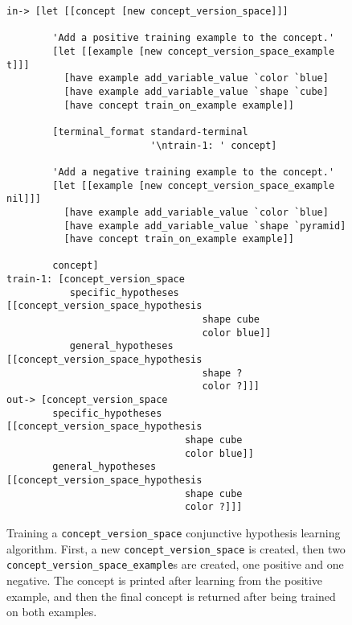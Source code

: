 \begin{figure}[h]
\centering
{\small
\begin{Verbatim}[frame=single]
 in-> [let [[concept [new concept_version_space]]]
   
        'Add a positive training example to the concept.'
        [let [[example [new concept_version_space_example t]]]
          [have example add_variable_value `color `blue]
          [have example add_variable_value `shape `cube]
          [have concept train_on_example example]]

        [terminal_format standard-terminal
                         '\ntrain-1: ' concept]
        
        'Add a negative training example to the concept.'
        [let [[example [new concept_version_space_example nil]]]
          [have example add_variable_value `color `blue]
          [have example add_variable_value `shape `pyramid]
          [have concept train_on_example example]]
        
        concept]
train-1: [concept_version_space
           specific_hypotheses [[concept_version_space_hypothesis
                                  shape cube
                                  color blue]]
           general_hypotheses  [[concept_version_space_hypothesis
                                  shape ?
                                  color ?]]]
out-> [concept_version_space
        specific_hypotheses [[concept_version_space_hypothesis
                               shape cube
                               color blue]]
        general_hypotheses  [[concept_version_space_hypothesis
                               shape cube
                               color ?]]]
\end{Verbatim}
}
\caption[Training a {\tt{concept\_version\_space}} conjunctive
  hypothesis learning algorithm.]{Training a
  {\tt{concept\_version\_space}} conjunctive hypothesis learning
  algorithm.  First, a new {\tt{concept\_version\_space}} is created,
  then two {\tt{concept\_version\_space\_example}}s are created, one
  positive and one negative.  The concept is printed after learning
  from the positive example, and then the final concept is returned
  after being trained on both examples.}
\label{figure:concept_version_space_training}
\end{figure}
